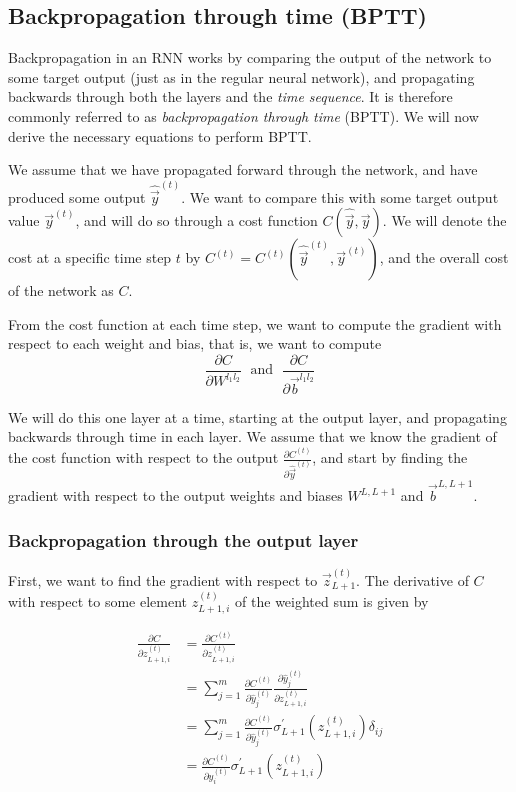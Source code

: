 \documentclass[11pt]{article}
\begin{document}
    \subsection{Backpropagation through time
(BPTT)}\label{backpropagation-through-time-bptt}

    Backpropagation in an RNN works by comparing the output of the network
to some target output (just as in the regular neural network), and
propagating backwards through both the layers and the \emph{time
sequence}. It is therefore commonly referred to as \emph{backpropagation
through time} (BPTT). We will now derive the necessary equations to
perform BPTT.

    We assume that we have propagated forward through the network, and have
produced some output \(\hat{\vec{y}}^{(t)}\). We want to compare this
with some target output value \(\vec{y}^{(t)}\), and will do so through
a cost function \(C \left(\hat{\vec{y}}, \vec{y} \right)\). We will
denote the cost at a specific time step \(t\) by
\(C^{(t)} = C^{(t)} \left(\hat{\vec{y}}^{(t)}, \vec{y}^{(t)} \right)\),
and the overall cost of the network as \(C\).

    From the cost function at each time step, we want to compute the
gradient with respect to each weight and bias, that is, we want to
compute \[
\frac{\partial C}{\partial W^{l_1 l_2}} \; \text{ and } \; \frac{\partial C}{\partial \vec{b}^{l_1 l_2}}
\]

    We will do this one layer at a time, starting at the output layer, and
propagating backwards through time in each layer. We assume that we know
the gradient of the cost function with respect to the output
\(\frac{\partial C^{(t)}}{\partial \hat{\vec{y}}^{(t)}}\), and start by
finding the gradient with respect to the output weights and biases
\(W^{L,L+1}\) and \(\vec{b}^{L,L+1}\).

    \subsubsection{Backpropagation through the output
layer}\label{backpropagation-through-the-output-layer}

    First, we want to find the gradient with respect to
\(\vec{z}_{L+1}^{(t)}\). The derivative of \(C\) with respect to some
element \(z_{L+1, i}^{(t)}\) of the weighted sum is given by

\begin{align*}
\frac{\partial C}{\partial z_{L+1,i}^{(t)}} &= \frac{\partial C^{(t)}}{\partial z_{L+1,i}^{(t)}}
\\[4ex]
&= \sum_{j=1}^m \frac{\partial C^{(t)}}{\partial \hat{y}_j^{(t)}}  \frac{\partial \hat{y}_j^{(t)}}{\partial z_{L+1,i}^{(t)}}
\\[4ex]
&= \sum_{j=1}^m \frac{\partial C^{(t)}}{\partial \hat{y}_j^{(t)}}  \sigma_{L+1}^\prime \left( z_{L+1,i}^{(t)} \right) \delta_{ij}
\\[4ex]
&= \frac{\partial C^{(t)}}{\partial \hat{y}_i^{(t)}}  \sigma_{L+1}^\prime \left( z_{L+1,i}^{(t)} \right)
\end{align*}
\end{document}
